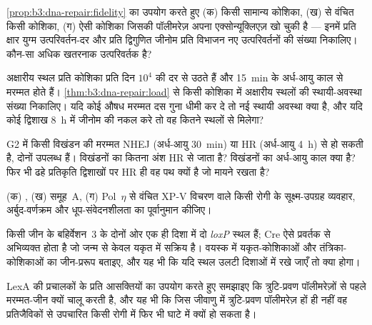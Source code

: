\begin{exercise}[$\star\star$]\label{exo:b3:dna-repair:5}
\cref{prop:b3:dna-repair:fidelity} का उपयोग करते हुए (क) किसी सामान्य
कोशिका, (ख)  से वंचित किसी कोशिका, (ग) ऐसी कोशिका जिसकी
पॉलीमरेज़ अपना एक्सोन्यूक्लिएज़ खो चुकी है --- इनमें प्रति क्षार युग्म
उत्परिवर्तन-दर और प्रति द्विगुणित जीनोम प्रति विभाजन नए उत्परिवर्तनों
की संख्या निकालिए। कौन-सा अधिक खतरनाक उत्परिवर्तक है?
\end{exercise}

\begin{exercise}[$\star\star$]\label{exo:b3:dna-repair:6}
अक्षारीय स्थल प्रति कोशिका प्रति दिन $10^{4}$ की दर से उठते हैं और
\qty{15}{min} के अर्ध-आयु काल से मरम्मत होते हैं।
\cref{thm:b3:dna-repair:load} से किसी कोशिका में अक्षारीय स्थलों की
स्थायी-अवस्था संख्या निकालिए। यदि कोई औषध मरम्मत दस गुना धीमी कर दे तो
नई स्थायी अवस्था क्या है, और यदि कोई द्विशाख \qty{8}{h} में जीनोम की
नकल करे तो वह कितने स्थलों से मिलेगा?
\end{exercise}

\begin{exercise}[$\star\star$]\label{exo:b3:dna-repair:7}
G2 में किसी विखंडन की मरम्मत NHEJ (अर्ध-आयु \qty{30}{min}) या HR
(अर्ध-आयु \qty{4}{h}) से हो सकती है, दोनों उपलब्ध हैं। विखंडनों का
कितना अंश HR से जाता है? विखंडनों का अर्ध-आयु काल क्या है? फिर भी ढहे
प्रतिकृति द्विशाखों पर HR ही वह पथ क्यों है जो मायने रखता है?
\end{exercise}

\begin{exercise}[$\star\star$]\label{exo:b3:dna-repair:8}
(क) , (ख)  समूह~A, (ग) Pol~$\eta$ से
वंचित XP-V विचरण वाले किसी रोगी के सूक्ष्म-उपग्रह व्यवहार, अर्बुद-वर्णक्रम
और धूप-संवेदनशीलता का पूर्वानुमान कीजिए।
\end{exercise}

\begin{exercise}[$\star\star$]\label{exo:b3:dna-repair:9}
किसी जीन के बहिर्वेशन~3 के दोनों ओर एक ही दिशा में दो \emph{loxP} स्थल
हैं; Cre ऐसे प्रवर्तक से अभिव्यक्त होता है जो जन्म से केवल यकृत में
सक्रिय है। वयस्क में यकृत-कोशिकाओं और तंत्रिका-कोशिकाओं का जीन-प्ररूप
बताइए, और यह भी कि यदि स्थल उलटी दिशाओं में रखे जाएँ तो क्या होगा।
\end{exercise}

\begin{exercise}[$\star\star\star$]\label{exo:b3:dna-repair:10}
LexA की प्रचालकों के प्रति आसक्तियों का उपयोग करते हुए समझाइए कि  त्रुटि-प्रवण पॉलीमरेज़ों से पहले मरम्मत-जीन क्यों चालू करती
है, और यह भी कि जिस जीवाणु में त्रुटि-प्रवण पॉलीमरेज़ हों ही नहीं वह
प्रतिजैविकों से उपचारित किसी रोगी में फिर भी घाटे में क्यों हो सकता है।
\end{exercise}

